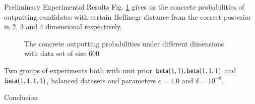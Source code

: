 \documentclass[final,hyperref={pdfpagelabels=false}]{beamer}
\begin{document}
\begin{frame}[t]
\begin{columns}[t]
\begin{column}{.485\textwidth}
\begin{block}{Preliminary Experimental Results}
Fig. \ref{fig_concrete_prob} gives us the concrete probabilities of outputting candidates with certain Hellinegr distance from the correct posterior in 2, 3 and 4 dimensional respectively.
\begin{figure}[H]
\begin{center}
\centering
\caption{The concrete outputting probabilities under different dimensions with data set of size $600$}
\label{fig_concrete_prob}
\end{center}
\end{figure}
\scriptsize{Two groups of experiments both with unit prior $\mathsf{beta}(1,1), \mathsf{beta}(1,1,1)$ and $\mathsf{beta}(1,1,1,1)$, balanced datasets and parameters $\epsilon = 1.0$ and $\delta = 10^{-8}$.}
\end{block}




\begin{block}{Conclusion}


\end{block}
\end{column}
\end{columns}
\end{frame}
\end{document}
